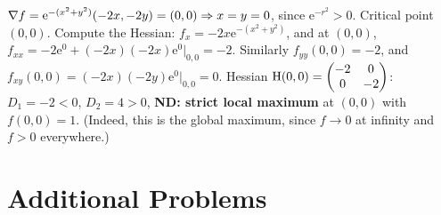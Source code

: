 \begin{solutions}
  \item $\nabla f = \mathrm{e}^{-(x^{2}+y^{2})}(-2x,-2y) = (0,0)
        \Rightarrow x=y=0$, since $\mathrm{e}^{-r^{2}}>0$. Critical point
        $(0,0)$. Compute the Hessian: $f_x = -2x\mathrm{e}^{-(x^{2}+y^{2})}$,
        and at $(0,0)$, $f_{xx} = -2\mathrm{e}^{0}+(-2x)(-2x)\mathrm{e}^{0}\big|_{0,0}=-2$.
        Similarly $f_{yy}(0,0)=-2$, and
        $f_{xy}(0,0) = (-2x)(-2y)\mathrm{e}^{0}\big|_{0,0}=0$. Hessian
        $\operatorname{H}(0,0) = \begin{pmatrix}-2&0\\0&-2\end{pmatrix}$: $D_1=-2<0$,
        $D_2=4>0$, \textbf{ND: strict local maximum} at $(0,0)$ with
        $f(0,0)=1$. (Indeed, this is the global maximum, since $f\to0$
        at infinity and $f>0$ everywhere.)
\end{solutions}

\section{Additional Problems}

